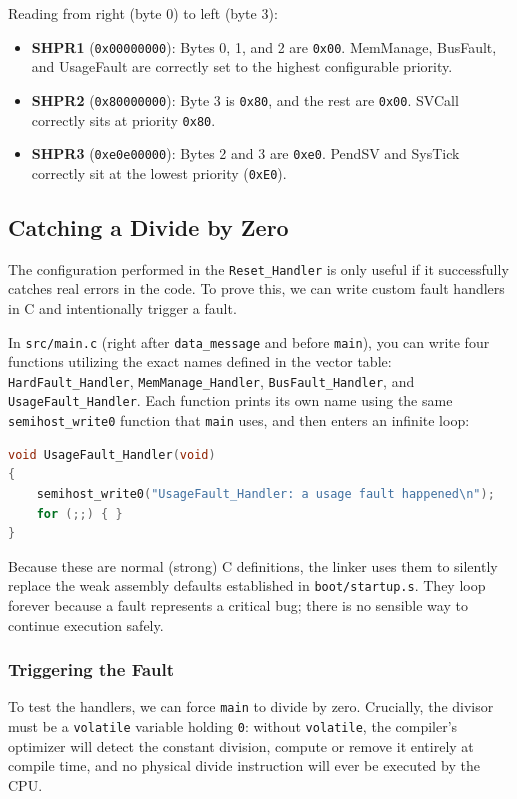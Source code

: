 Reading from right (byte 0) to left (byte 3):
\begin{itemize}
    \item \textbf{SHPR1} (\texttt{0x00000000}): Bytes 0, 1, and 2 are \texttt{0x00}. MemManage, BusFault, and UsageFault are correctly set to the highest configurable priority.
    \item \textbf{SHPR2} (\texttt{0x80000000}): Byte 3 is \texttt{0x80}, and the rest are \texttt{0x00}. SVCall correctly sits at priority \texttt{0x80}.
    \item \textbf{SHPR3} (\texttt{0xe0e00000}): Bytes 2 and 3 are \texttt{0xe0}. PendSV and SysTick correctly sit at the lowest priority (\texttt{0xE0}).
\end{itemize}

\subsection{Catching a Divide by Zero}
The configuration performed in the \texttt{Reset\_Handler} is only useful if it successfully catches real errors in the code. To prove this, we can write custom fault handlers in C and intentionally trigger a fault.

In \texttt{src/main.c} (right after \texttt{data\_message} and before \texttt{main}), you can write four functions utilizing the exact names defined in the vector table: \texttt{HardFault\_Handler}, \texttt{MemManage\_Handler}, \texttt{BusFault\_Handler}, and \texttt{UsageFault\_Handler}. Each function prints its own name using the same \texttt{semihost\_write0} function that \texttt{main} uses, and then enters an infinite loop:

\begin{lstlisting}[language=c]
void UsageFault_Handler(void)
{
    semihost_write0("UsageFault_Handler: a usage fault happened\n");
    for (;;) { }
}
\end{lstlisting}

Because these are normal (strong) C definitions, the linker uses them to silently replace the weak assembly defaults established in \texttt{boot/startup.s}. They loop forever because a fault represents a critical bug; there is no sensible way to continue execution safely.

\subsubsection{Triggering the Fault}
To test the handlers, we can force \texttt{main} to divide by zero. Crucially, the divisor must be a \texttt{volatile} variable holding \texttt{0}: without \texttt{volatile}, the compiler's optimizer will detect the constant division, compute or remove it entirely at compile time, and no physical divide instruction will ever be executed by the CPU.

